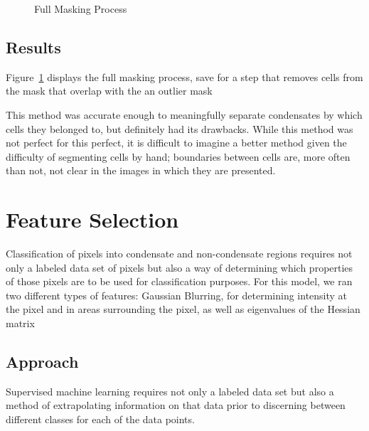 \documentclass[11pt]{article}
\begin{document}
\begin{figure}[h]
{{        }
    }\caption{Full Masking Process}
    \label{fig:masking_process}
\end{figure}

\subsection{Results}

Figure~\ref{fig:masking_process} displays the full masking process, save for a step that removes
cells from the mask that overlap with the an outlier mask  

This method was accurate enough to meaningfully separate condensates by which cells they belonged
to, but definitely had its drawbacks. While this method was not perfect for this perfect, it is
difficult to imagine a better method given the difficulty of segmenting cells by hand; boundaries
between cells are, more often than not, not clear in the images in which they are presented. 

\section{Feature Selection}
Classification of pixels into condensate and non-condensate regions requires not only a labeled data
set of pixels but also a way of determining which properties of those pixels are to be used for
classification purposes. For this model, we ran two different types of features: Gaussian Blurring,
for determining intensity at the pixel and in areas surrounding the pixel, as well as eigenvalues of
the Hessian matrix 

\subsection{Approach}

Supervised machine learning requires not only a labeled data set but also a method of extrapolating
information on that data prior to discerning between different classes for each of the data points. 
\end{document}
